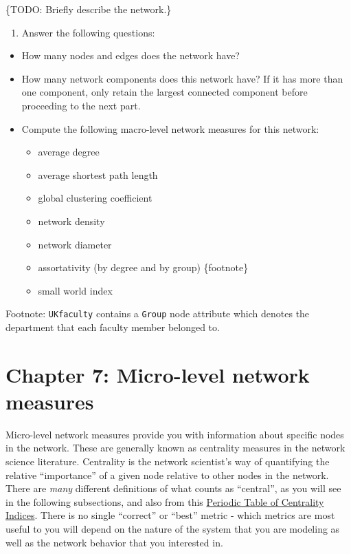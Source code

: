 \documentclass[
]{book}
\providecommand{\tightlist}{%
  \setlength{\itemsep}{0pt}\setlength{\parskip}{0pt}}
\begin{document}
\{TODO: Briefly describe the network.\}

\begin{enumerate}
\def\labelenumi{\arabic{enumi}.}
\setcounter{enumi}{1}
\tightlist
\item
  Answer the following questions:
\end{enumerate}

\begin{itemize}
\item
  How many nodes and edges does the network have?
\item
  How many network components does this network have? If it has more than one component, only retain the largest connected component before proceeding to the next part.
\item
  Compute the following macro-level network measures for this network:

  \begin{itemize}
  \tightlist
  \item
    average degree
  \item
    average shortest path length
  \item
    global clustering coefficient
  \item
    network density
  \item
    network diameter
  \item
    assortativity (by degree and by group) \{footnote\}
  \item
    small world index
  \end{itemize}
\end{itemize}

Footnote: \texttt{UKfaculty} contains a \texttt{Group} node attribute which denotes the department that each faculty member belonged to.

\chapter{Chapter 7: Micro-level network measures}\label{ch7}

Micro-level network measures provide you with information about specific nodes in the network. These are generally known as centrality measures in the network science literature. Centrality is the network scientist's way of quantifying the relative ``importance'' of a given node relative to other nodes in the network. There are \emph{many} different definitions of what counts as ``central'', as you will see in the following subsections, and also from this \href{http://schochastics.net/sna/periodic.html}{Periodic Table of Centrality Indices}. There is no single ``correct'' or ``best'' metric - which metrics are most useful to you will depend on the nature of the system that you are modeling as well as the network behavior that you interested in.
\end{document}
